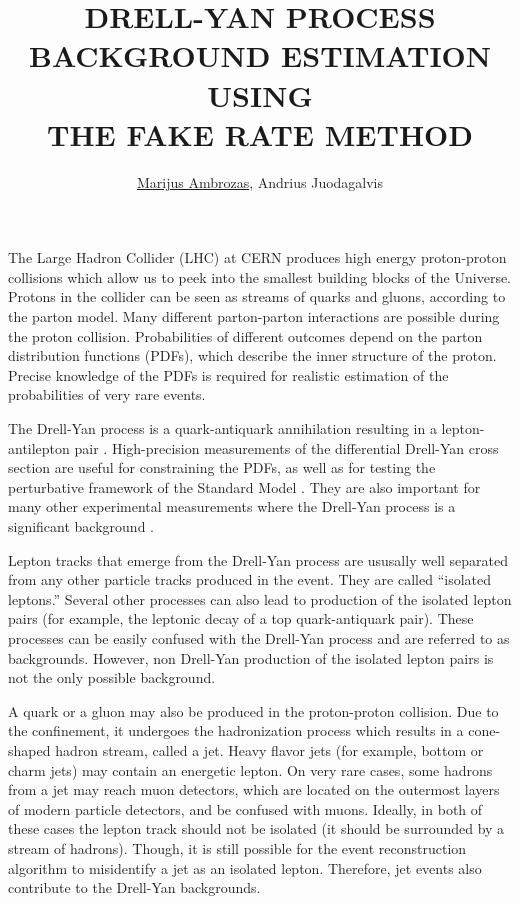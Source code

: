 \documentclass[a4paper,10pt,english]{article}
\begin{document}
\renewcommand{\figurename}{Fig.} 


\title{DRELL-YAN PROCESS BACKGROUND ESTIMATION USING\\ THE FAKE RATE METHOD}


\author{\uline{Marijus Ambrozas}, Andrius Juodagalvis}

\maketitle

\address{Institute of Theoretical Physics and Astronomy, Faculty of Physics, Vilnius University, Lithuania}


The Large Hadron Collider (LHC) at CERN produces high energy proton-proton collisions which allow us to
peek into the smallest building blocks of the Universe.
Protons in the collider can be seen as streams of quarks and gluons, according to the parton model.
Many different parton-parton interactions are possible during the proton collision.
Probabilities of different outcomes depend on the parton distribution functions (PDFs), which describe
the inner structure of the proton.
Precise knowledge of the PDFs is required for realistic estimation of the probabilities of very rare events.

The Drell-Yan process is a quark-antiquark annihilation resulting in a lepton-antilepton pair \cite{DY}.
High-precision measurements of the differential Drell-Yan cross section are useful for constraining the PDFs, as
well as for testing the perturbative framework of the Standard Model \cite{DY13}.
They are also important for many other experimental measurements where the Drell-Yan process
is a significant background \cite{Higgs, Zprime, SUSY}.

Lepton tracks that emerge from the Drell-Yan process are ususally well separated from any other particle tracks
produced in the event.
They are called ``isolated leptons.''
Several other processes can also lead to production of the isolated lepton pairs (for example, the
leptonic decay of a top quark-antiquark pair).
These processes can be easily confused with the Drell-Yan process and are referred to as backgrounds.
However, non Drell-Yan production of the isolated lepton pairs is not the only possible background.

A quark or a gluon may also be produced in the proton-proton collision.
Due to the confinement, it undergoes the hadronization process which results in a cone-shaped hadron stream, called a jet.
Heavy flavor jets (for example, bottom or charm jets) may contain an energetic lepton.
On very rare cases, some hadrons from a jet may reach muon detectors, which are located on the outermost
layers of modern particle detectors, and be confused with muons.
Ideally, in both of these cases the lepton track should not be isolated (it should be surrounded by a stream of hadrons).
Though, it is still  possible for the event reconstruction algorithm to misidentify a jet as an isolated lepton.
Therefore, jet events also contribute to the Drell-Yan backgrounds.
\end{document}

